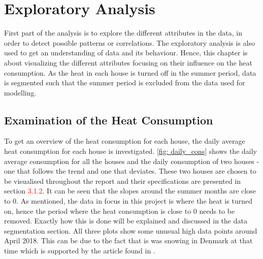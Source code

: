 \chapter{Exploratory Analysis}
\label{chap: exploratory}
First part of the analysis is to explore the different attributes in the data, in order to detect possible patterns or correlations. The exploratory analysis is also used to get an understanding of data and its behaviour. Hence, this chapter is about visualizing the different attributes focusing on their influence on the heat consumption. As the heat in each house is turned off in the summer period, data is segmented such that the summer period is excluded from the data used for modelling. \\

\section{Examination of the Heat Consumption}
\noindent To get an overview of the heat consumption for each house, the daily average heat consumption for each house is investigated. \cref{fig: daily_cons} shows the daily average consumption for all the houses and the daily consumption of two houses - one that follows the trend and one that deviates. These two houses are chosen to be visualised throughout the report and their specifications are presented in section \textcolor{red}{3.1.2}. It can be seen that the slopes around the summer months are close to 0. As mentioned, the data in focus in this project is where the heat is turned on, hence the period where the heat consumption is close to 0 needs to be removed. Exactly how this is done will be explained and discussed in the data segmentation section. All three plots show some unusual high data points around April 2018. This can be due to the fact that is was snowing in Denmark at that time which is supported by the article found in \cite{vejr2018}. \\
